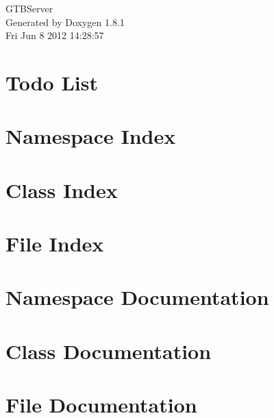 \documentclass{book}
\begin{document}
\hypersetup{pageanchor=false,citecolor=blue}
\begin{titlepage}
\vspace*{7cm}
\begin{center}
{\Large G\-T\-B\-Server }\\
\vspace*{1cm}
{\large Generated by Doxygen 1.8.1}\\
\vspace*{0.5cm}
{\small Fri Jun 8 2012 14:28:57}\\
\end{center}
\end{titlepage}
\clearemptydoublepage
{}
\tableofcontents
\clearemptydoublepage
{}
\hypersetup{pageanchor=true,citecolor=blue}
\chapter{Todo List}
\label{todo}
\hypertarget{todo}{}

\chapter{Namespace Index}

\chapter{Class Index}

\chapter{File Index}

\chapter{Namespace Documentation}


\chapter{Class Documentation}











\chapter{File Documentation}












\printindex
\end{document}

